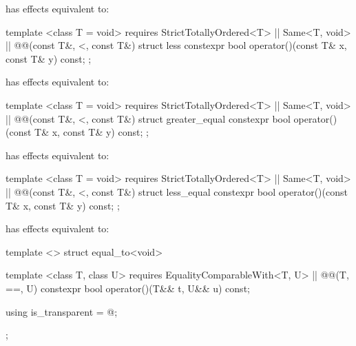 {\begin{itemdescr}
\pnum
{} has effects equivalent to: 
\end{itemdescr}

%
\begin{itemdecl}
template <class T = void>
  requires StrictTotallyOrdered<T> || Same<T, void> || @\textit{}@(const T&, <, const T&)
struct less {
  constexpr bool operator()(const T& x, const T& y) const;
};
\end{itemdecl}

\begin{itemdescr}
\pnum
{} has effects equivalent to: 
\end{itemdescr}

%
\begin{itemdecl}
template <class T = void>
  requires StrictTotallyOrdered<T> || Same<T, void> || @\textit{}@(const T&, <, const T&)
struct greater_equal {
  constexpr bool operator()(const T& x, const T& y) const;
};
\end{itemdecl}

\begin{itemdescr}
\pnum
{} has effects equivalent to: 
\end{itemdescr}

%
\begin{itemdecl}
template <class T = void>
  requires StrictTotallyOrdered<T> || Same<T, void> || @\textit{}@(const T&, <, const T&)
struct less_equal {
  constexpr bool operator()(const T& x, const T& y) const;
};
\end{itemdecl}

\begin{itemdescr}
\pnum
{} has effects equivalent to: 
\end{itemdescr}

%
\begin{itemdecl}
template <> struct equal_to<void> {
  template <class T, class U>
    requires EqualityComparableWith<T, U> || @\textit{}@(T, ==, U)
  constexpr bool operator()(T&& t, U&& u) const;

  using is_transparent = @\unspec@;
};
\end{itemdecl}

}
